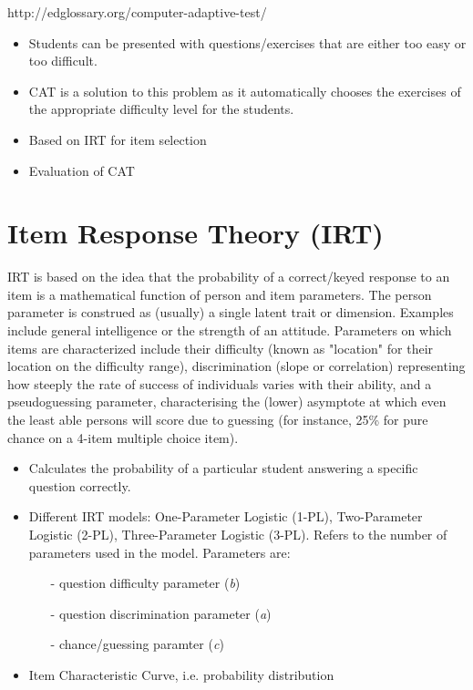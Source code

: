 \documentclass[11pt,a4paper]{report}
\begin{document}
http://edglossary.org/computer-adaptive-test/
\begin{itemize}
\item Students can be presented with questions/exercises that are either too easy or too difficult.
\item CAT is a solution to this problem as it automatically chooses the exercises of the appropriate difficulty level for the students.
\item Based on IRT for item selection
\item Evaluation of CAT
\end{itemize}

\section{Item Response Theory (IRT)}
IRT is based on the idea that the probability of a correct/keyed response to an item is a mathematical function of person and item parameters. The person parameter is construed as (usually) a single latent trait or dimension. Examples include general intelligence or the strength of an attitude. Parameters on which items are characterized include their difficulty (known as "location" for their location on the difficulty range), discrimination (slope or correlation) representing how steeply the rate of success of individuals varies with their ability, and a pseudoguessing parameter, characterising the (lower) asymptote at which even the least able persons will score due to guessing (for instance, 25\% for pure chance on a 4-item multiple choice item).


\begin{itemize}
\item Calculates the probability of a particular student answering a specific question correctly.
\item Different IRT models: One-Parameter Logistic (1-PL), Two-Parameter Logistic (2-PL), Three-Parameter Logistic (3-PL). Refers to the number of parameters used in the model. Parameters are: 

\begin{itemize}
\item[-] question difficulty parameter (\textit{b})
\item[-] question discrimination parameter (\textit{a})
\item[-] chance/guessing paramter (\textit{c})
\end{itemize}

\item Item Characteristic Curve, i.e. probability distribution

\end{itemize}
\end{document}
